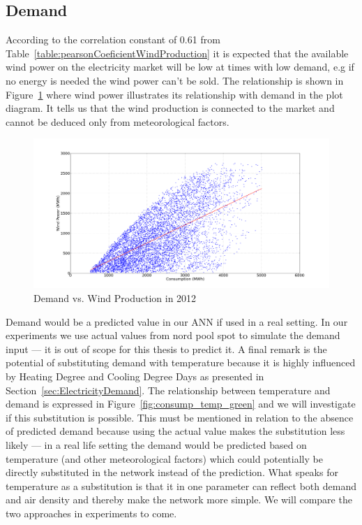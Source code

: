 \subsection{Demand}
\label{sec:demandWindProduction}
According to the correlation constant of 0.61 from Table~\ref{table:pearsonCoeficientWindProduction} it is expected that the available wind power on the electricity market will be low at times with low demand, e.g if no energy is needed the wind power can't be sold.  The relationship is shown in Figure~\ref{fig:demandVsWindProduction} where wind power illustrates its relationship with demand in the plot diagram. It tells us that the wind production is connected to the market and cannot be deduced only from meteorological factors.

\begin{figure}[H]
\centering
\includegraphics[width=0.95\linewidth]{billeder/consumptionVsWindProduction.png}
\caption{Demand vs. Wind Production in 2012}
\label{fig:demandVsWindProduction}
\end{figure}

\noindent Demand would be a predicted value in our ANN if used in a real setting. In our experiments we use actual values from nord pool spot to simulate the demand input --- it is out of scope for this thesis to predict it. A final remark is the potential of substituting demand with temperature because it is highly influenced by Heating Degree and Cooling Degree Days as presented in Section~\ref{sec:ElectricityDemand}. The relationship between temperature and demand is expressed in Figure~\ref{fig:consump_temp_green} and we will investigate if this substitution is possible. This must be mentioned in relation to the absence of predicted demand because using the actual value makes the substitution less likely --- in a real life setting the demand would be predicted based on temperature (and other meteorological factors) which could potentially be directly substituted in the network instead of the prediction. What speaks for temperature as a substitution is that it in one parameter can reflect both demand and air density and thereby make the network more simple. We will compare the two approaches in experiments to come. 

